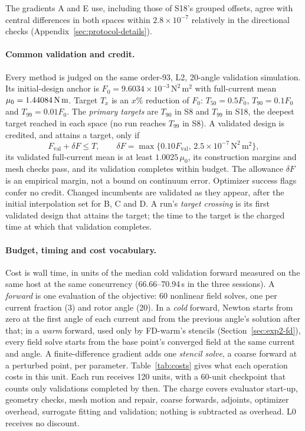 The gradients A and E use, including those of S18's grouped offsets,
agree with central differences in both spaces within $2.8\times10^{-7}$
relatively in the directional checks (Appendix~\ref{sec:protocol-details}).

\paragraph{Common validation and credit.}
Every method is judged on the same order-93, L2, 20-angle validation simulation.
Its initial-design anchor is $F_0=9.6034\times10^{-3}\,\mathrm{N^2\,m^2}$ with
full-current mean $\mu_0=1.44084\,\mathrm{N\,m}$. Target $T_x$ is an $x$\% reduction
of $F_0$: $T_{50}=0.5F_0$, $T_{90}=0.1F_0$ and $T_{99}=0.01F_0$. The
\emph{primary targets} are $T_{90}$ in S8 and $T_{99}$ in S18, the deepest
target reached in each space (no run reaches $T_{99}$ in S8). A validated
design is credited, and attains a target, only if
\begin{equation}
 F_{\mathrm{val}}+\delta F\leq T,\qquad
 \delta F=\max\{0.10F_{\mathrm{val}},\,2.5\times10^{-7}\,\mathrm{N^2\,m^2}\},
\end{equation}
its validated full-current mean is at least $1.0025\,\mu_0$, its
construction margins and mesh checks pass, and its validation completes
within budget. The allowance $\delta F$ is an empirical margin, not a bound
on continuum error. Optimizer success flags confer no credit. Changed
incumbents are validated as they appear, after the initial interpolation
set for B, C and D. A run's \emph{target crossing} is its first validated
design that attains the target; the time to the target is the charged time
at which that validation completes.

\paragraph{Budget, timing and cost vocabulary.}
Cost is wall time, in units of the median cold validation forward measured
on the same host at the same concurrency (66.66--70.94\,s in the three
sessions). A \emph{forward} is one evaluation of the objective: 60
nonlinear field solves, one per current fraction (3) and rotor angle (20).
In a \emph{cold} forward, Newton starts from zero at the first angle of each
current and from the previous angle's solution after that; in a
\emph{warm} forward, used only by FD-warm's stencils
(Section~\ref{sec:exp2-fd}), every field solve starts from the base
point's converged field at the same current and angle. A
finite-difference gradient adds one \emph{stencil solve}, a coarse
forward at a perturbed point, per parameter. Table~\ref{tab:costs} gives
what each operation costs in this unit. Each run receives 120 units,
with a 60-unit checkpoint that counts only validations completed by then.
The charge covers evaluator start-up, geometry checks, mesh motion and
repair, coarse forwards, adjoints, optimizer overhead, surrogate fitting
and validation; nothing is subtracted as overhead. L0 receives no discount.

